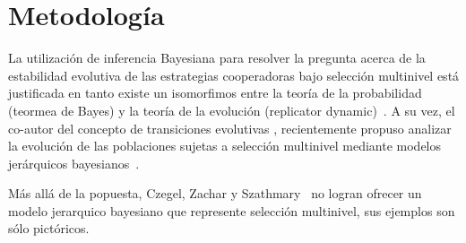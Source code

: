 \documentclass[a4paper,10pt]{article}
\begin{document}
% 
% 
% 

\section{Metodología}

La utilización de inferencia Bayesiana para resolver la pregunta acerca de la estabilidad evolutiva de las estrategias cooperadoras bajo selección multinivel está justificada en tanto existe un isomorfimos entre la teoría de la probabilidad (teormea de Bayes) y la teoría de la evolución (replicator dynamic)~\cite{harper2009-replicatorAsInference,shalizi2009-replicatorAsInference}.
A su vez, el co-autor del concepto de transiciones evolutivas \cite{szathmary1995-evolutionaryTransitions, szathmary2015-evolutionaryTransitions}, recientemente propuso analizar la evolución de las poblaciones sujetas a selección multinivel mediante modelos jerárquicos bayesianos~\cite{czegel2019-bayesianEvolution}.

\begin{framed}
Más allá de la popuesta, Czegel, Zachar y Szathmary~\cite{czegel2019-bayesianEvolution} no logran ofrecer un modelo jerarquico bayesiano que represente selección multinivel, sus ejemplos son sólo pictóricos.
\end{framed}
\end{document}
